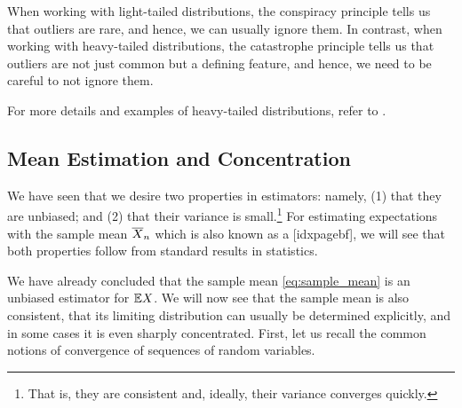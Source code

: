 When working with light-tailed distributions, the conspiracy principle tells us that outliers are rare, and hence, we can usually ignore them.
In contrast, when working with heavy-tailed distributions, the catastrophe principle tells us that outliers are not just common but a defining feature, and hence, we need to be careful to not ignore them.

\begin{readings}
  For more details and examples of heavy-tailed distributions, refer to .
\end{readings}

\subsection{Mean Estimation and Concentration}\label{sec:fundamentals:mc_approx}%

We have seen that we desire two properties in estimators: namely, (1) that they are unbiased; and (2) that their variance is small.\footnote{That is, they are consistent and, ideally, their variance converges quickly.}
For estimating expectations with the sample mean $\overline{X}_n$ which is also known as a [idxpagebf], we will see that both properties follow from standard results in statistics.

We have already concluded that the sample mean \eqref{eq:sample_mean} is an unbiased estimator for $\E*{X}$.
We will now see that the sample mean is also consistent, that its limiting distribution can usually be determined explicitly, and in some cases it is even sharply concentrated.
First, let us recall the common notions of convergence of sequences of random variables.

